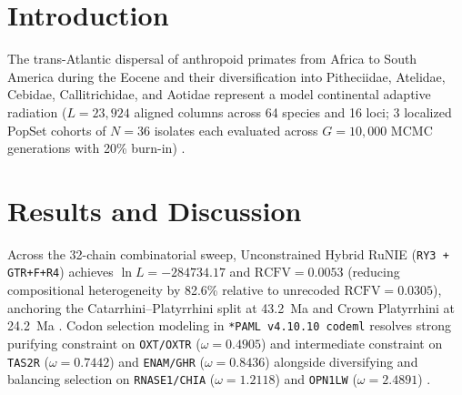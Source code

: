 \documentclass[10pt,letterpaper]{article}
\begin{document}
\section{Introduction}
The trans-Atlantic dispersal of anthropoid primates from Africa to South America during the Eocene and their diversification into Pitheciidae, Atelidae, Cebidae, Callitrichidae, and Aotidae represent a model continental adaptive radiation ($L = 23,924$ aligned columns across 64 species and 16 loci; 3 localized PopSet cohorts of $N = 36$ isolates each evaluated across $G = 10,000$ MCMC generations with 20\% burn-in) \cite{White2026RuNIE,Bond2015,Seiffert2020,Perelman2011,Springer2012,Kuderna2023}.

\section{Results and Discussion}
Across the 32-chain combinatorial sweep, Unconstrained Hybrid RuNIE (\texttt{RY3 + GTR+F+R4}) achieves $\ln L = -284734.17$ and $\text{RCFV} = 0.0053$ (reducing compositional heterogeneity by 82.6\% relative to unrecoded $\text{RCFV} = 0.0305$), anchoring the Catarrhini--Platyrrhini split at 43.2~Ma and Crown Platyrrhini at 24.2~Ma \cite{Katoh2013,Minh2020,To2016}. Codon selection modeling in \texttt{*PAML v4.10.10 codeml} \cite{Yang2007} resolves strong purifying constraint on \texttt{OXT/OXTR} ($\omega = 0.4905$) \cite{VargasPinilla2015,Lee2011} and intermediate constraint on \texttt{TAS2R} ($\omega = 0.7442$) \cite{Hayakawa2014} and \texttt{ENAM/GHR} ($\omega = 0.8436$) alongside diversifying and balancing selection on \texttt{RNASE1/CHIA} ($\omega = 1.2118$) \cite{Schienman2006,Janiak2018} and \texttt{OPN1LW} ($\omega = 2.4891$) \cite{Surridge2003,Kawamura2012,Lima2017,Drummond2005}.
\end{document}

